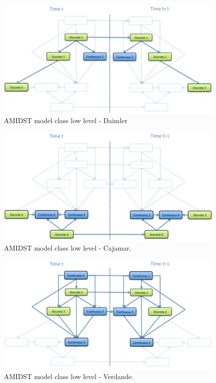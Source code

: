 \begin{figure}[ht!]
\begin{center}
\includegraphics[scale=0.39]{./figures/AMIDSTModelClassDaimler}
\caption{\label{Figure:AMIDSTModelClassDaimler} AMIDST model class low level - Daimler}
\end{center}
\end{figure}

\begin{figure}[ht!]
\begin{center}
\includegraphics[scale=0.39]{./figures/AMIDSTModelClassCajamar.png}
\caption{\label{Figure:AMIDSTModelClassCajamar} AMIDST model class low level - Cajamar.}
\end{center}
\end{figure}

\begin{figure}[ht!]
\begin{center}
\includegraphics[scale=0.39]{./figures/AMIDSTModelClassVerdande}
\caption{\label{Figure:AMIDSTModelClassVerdande} AMIDST model class low level - Verdande.}
\end{center}
\end{figure}

